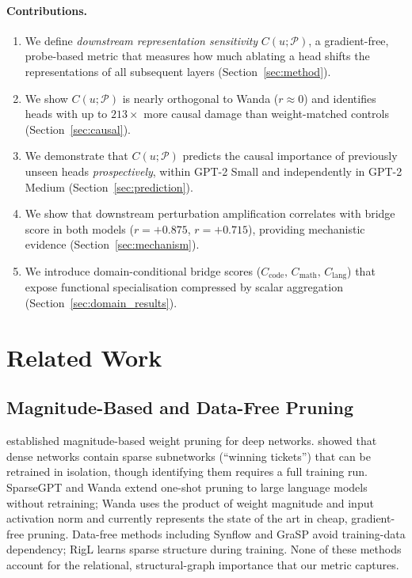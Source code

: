 \documentclass[11pt,a4paper]{article}
\theoremstyle{definition}
\theoremstyle{plain}
\begin{document}
\paragraph{Contributions.}
\begin{enumerate}[leftmargin=*,topsep=2pt,itemsep=2pt]
    \item We define \emph{downstream representation sensitivity}
    $C(u;\mathcal{P})$, a gradient-free, probe-based metric that measures
    how much ablating a head shifts the representations of all subsequent
    layers (Section~\ref{sec:method}).
    \item We show $C(u;\mathcal{P})$ is nearly orthogonal to Wanda
    ($r\approx 0$) and identifies heads with up to $213\times$ more causal
    damage than weight-matched controls (Section~\ref{sec:causal}).
    \item We demonstrate that $C(u;\mathcal{P})$ predicts the causal
    importance of previously unseen heads \emph{prospectively}, within
    GPT-2 Small and independently in GPT-2 Medium
    (Section~\ref{sec:prediction}).
    \item We show that downstream perturbation amplification
    correlates with bridge score in both models ($r=+0.875$, $r=+0.715$),
    providing mechanistic evidence
    (Section~\ref{sec:mechanism}).
    \item We introduce domain-conditional bridge scores
    ($C_{\text{code}},\, C_{\text{math}},\, C_{\text{lang}}$) that expose
    functional specialisation compressed by scalar aggregation
    (Section~\ref{sec:domain_results}).
\end{enumerate}

\section{Related Work}
\label{sec:related}

\subsection{Magnitude-Based and Data-Free Pruning}

\citet{han2015learning} established magnitude-based weight pruning for deep
networks.
\citet{frankle2019lottery} showed that dense networks contain sparse
subnetworks (``winning tickets'') that can be retrained in isolation, though
identifying them requires a full training run.
SparseGPT \citep{frantar2023sparsegpt} and Wanda \citep{sun2024wanda}
extend one-shot pruning to large language models without retraining; Wanda
uses the product of weight magnitude and input activation norm and
currently represents the state of the art in cheap, gradient-free pruning.
Data-free methods including Synflow \citep{tanaka2020synflow} and GraSP
\citep{wang2020grasp} avoid training-data dependency; RigL
\citep{evci2020rigging} learns sparse structure during training.
None of these methods account for the relational, structural-graph
importance that our metric captures.
\end{document}
